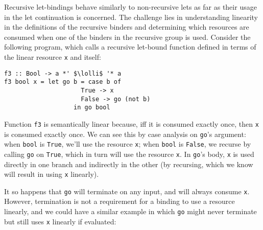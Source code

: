 \documentclass[acmsmall,review,screen]{acmart}
\newcommand{\incode}[1]{\lstinline{#1}}
\newcommand{\lolli}{\multimap}
\begin{document}
Recursive let-bindings
behave similarly to non-recursive lets as far as their usage in the let
continuation is concerned.
%
The challenge lies in understanding linearity in the definitions of the
recursive binders and determining which resources are consumed when one of the
binders in the recursive group is used.
%
Consider the following program, which calls a recursive let-bound function
defined in terms of the linear resource \incode{x} and itself:
%
\begin{notyet}
\begin{lstlisting}
f3 :: Bool -> a *' $\lolli$ '* a
f3 bool x = let go b = case b of
                     True -> x
                     False -> go (not b)
                   in go bool
\end{lstlisting}
\end{notyet}
%
Function \incode{f3} is semantically linear because, iff it is consumed exactly once,
then \incode{x} is consumed exactly once. We can see this by case analysis on \incode{go}'s argument:
when \incode{bool} is \incode{True}, we'll use the resource \incode{x};
 when \incode{bool} is \incode{False}, we recurse by calling \incode{go} on \incode{True}, which in turn will use the resource \incode{x}.
In \incode{go}'s body, \incode{x} is used directly in one branch and indirectly in the
other (by recursing, which we know will result in using \incode{x} linearly).
%

It so happens that \incode{go} will terminate on any input, and will always consume
\incode{x}. However, termination is not a requirement for a binding to use a resource linearly,
and we could have a similar example in which \incode{go} might never terminate but still
uses \incode{x} linearly if evaluated:
\end{document}
